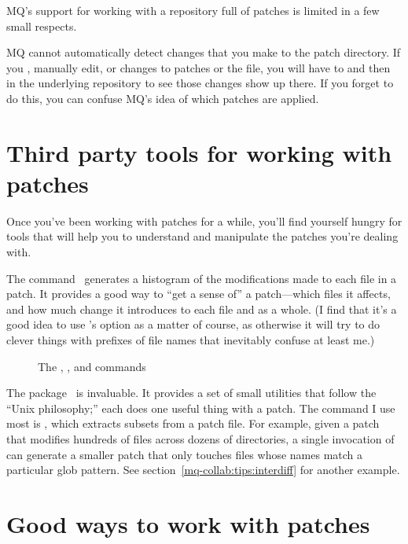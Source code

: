MQ's support for working with a repository full of patches is limited
in a few small respects.

MQ cannot automatically detect changes that you make to the patch
directory.  If you , manually edit, or 
changes to patches or the  file, you will have to
 and then
 in the underlying repository to
see those changes show up there.  If you forget to do this, you can
confuse MQ's idea of which patches are applied.

\section{Third party tools for working with patches}
\label{sec:mq:tools}

Once you've been working with patches for a while, you'll find
yourself hungry for tools that will help you to understand and
manipulate the patches you're dealing with.

The  command~\cite{web:diffstat} generates a
histogram of the modifications made to each file in a patch.  It
provides a good way to ``get a sense of'' a patch---which files it
affects, and how much change it introduces to each file and as a
whole.  (I find that it's a good idea to use 's
 option as a matter of course, as otherwise it
will try to do clever things with prefixes of file names that
inevitably confuse at least me.)

\begin{figure}[ht]
  \caption{The , , and  commands}
  \label{ex:mq:tools}
\end{figure}

The  package~\cite{web:patchutils} is invaluable.
It provides a set of small utilities that follow the ``Unix
philosophy;'' each does one useful thing with a patch.  The
 command I use most is , which
extracts subsets from a patch file.  For example, given a patch that
modifies hundreds of files across dozens of directories, a single
invocation of  can generate a smaller patch that
only touches files whose names match a particular glob pattern.  See
section~\ref{mq-collab:tips:interdiff} for another example.

\section{Good ways to work with patches}

